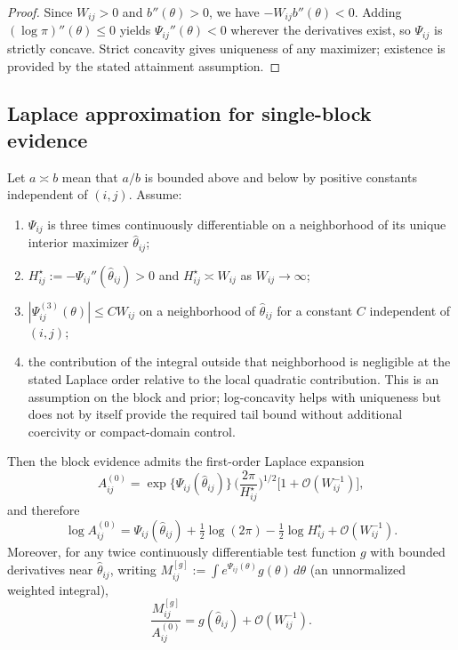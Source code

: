 \begin{proof}
Since $W_{ij}>0$ and $b''(\theta)>0$, we have $-W_{ij}b''(\theta)<0$. Adding
$(\log\pi)''(\theta)\le 0$ yields $\Psi_{ij}''(\theta)<0$ wherever the derivatives exist, so
$\Psi_{ij}$ is strictly concave. Strict concavity gives uniqueness of any maximizer; existence is
provided by the stated attainment assumption.
\end{proof}

\subsection{Laplace approximation for single-block evidence}

\begin{theorem}
\label{thm:laplace}
Let $a\asymp b$ mean that $a/b$ is bounded above and below by positive constants independent of
$(i,j)$. Assume:
\begin{enumerate}
\item[(A1)] $\Psi_{ij}$ is three times continuously differentiable on a neighborhood of its
unique interior maximizer $\hat\theta_{ij}$;
\item[(A2)] $H_{ij}^{\star}:=-\Psi_{ij}''(\hat\theta_{ij})>0$ and $H_{ij}^{\star}\asymp W_{ij}$ as $W_{ij}\to\infty$;
\item[(A3)] $|\Psi_{ij}^{(3)}(\theta)|\le C W_{ij}$ on a neighborhood of $\hat\theta_{ij}$ for a constant $C$
independent of $(i,j)$;
\item[(A4)] the contribution of the integral outside that neighborhood is negligible at the stated
Laplace order relative to the local quadratic contribution. This is an assumption on the block and
prior; log-concavity helps with uniqueness but does not by itself provide the required tail bound
without additional coercivity or compact-domain control.
\end{enumerate}
Then the block evidence admits the first-order Laplace expansion
\begin{equation}
A^{(0)}_{ij}
= \exp\{\Psi_{ij}(\hat\theta_{ij})\}\,\Big(\frac{2\pi}{H_{ij}^{\star}}\Big)^{1/2}
\Big[1+\mathcal{O}(W_{ij}^{-1})\Big],
\label{eq:laplace-A0-mult}
\end{equation}
and therefore
\begin{equation}
\log A^{(0)}_{ij}
= \Psi_{ij}(\hat\theta_{ij}) + \tfrac{1}{2}\log(2\pi)
  - \tfrac{1}{2}\log H_{ij}^{\star} + \mathcal{O}(W_{ij}^{-1}).
\label{eq:laplace-A0}
\end{equation}
Moreover, for any twice continuously differentiable test function $g$ with bounded derivatives near
$\hat\theta_{ij}$, writing $M^{[g]}_{ij}:=\int e^{\Psi_{ij}(\theta)}g(\theta)\,d\theta$ (an
unnormalized weighted integral),
\begin{equation}
\frac{M^{[g]}_{ij}}{A^{(0)}_{ij}}
= g(\hat\theta_{ij}) + \mathcal{O}(W_{ij}^{-1}).
\label{eq:laplace-moment}
\end{equation}
\end{theorem}


